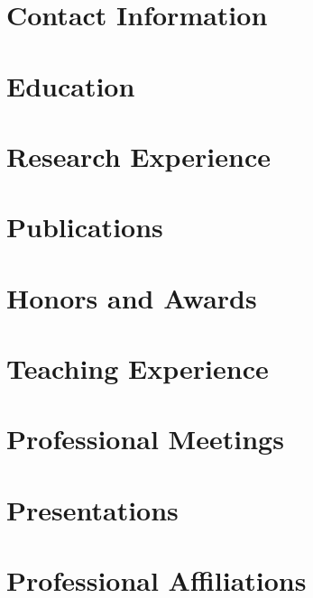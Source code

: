 \documentclass[letterpaper,10pt]{article}
\begin{document}
\section{Contact Information}



\section{Education}


\section{Research Experience}

\section{Publications}




\section{Honors and Awards}

\section{Teaching Experience}

\section{Professional Meetings}

\section{Presentations}

\section{Professional Affiliations}
\end{document}
